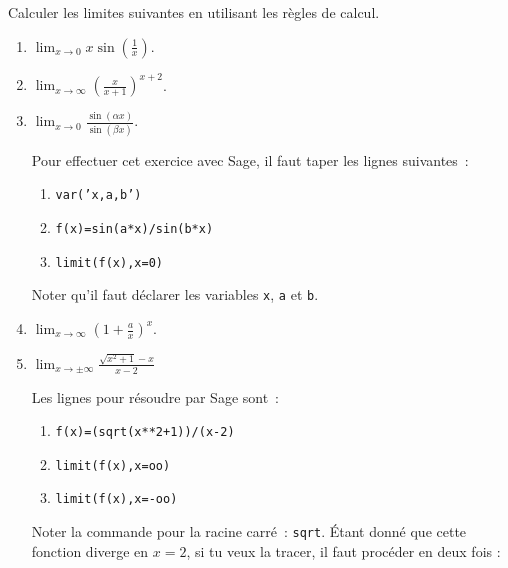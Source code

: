 

\begin{exercice}\label{exoINGE11140031}

	Calculer les limites suivantes en utilisant les règles de calcul.
	\begin{enumerate}

		\item	\label{ItemexoINGE_11140031xsinusx}
			$\lim_{x\to 0} x\sin(\frac{1}{ x })$.

		\item
			$\lim_{x\to \infty} \left( \frac{ x }{ x+1 } \right)^{x+2}$.

		\item	\label{ItemexoINGE_11140031}
			$\lim_{x\to 0} \frac{ \sin(\alpha x) }{ \sin(\beta x) }$.

			Pour effectuer cet exercice avec Sage, il faut taper les lignes suivantes~:
			\begin{enumerate}

				\item
					\texttt{var('x,a,b')}
				\item
					\texttt{f(x)=sin(a*x)/sin(b*x)}
				\item
					\texttt{limit(f(x),x=0)}

			\end{enumerate}
			Noter qu'il faut déclarer les variables \texttt{x}, \texttt{a} et \texttt{b}.

		\item
			$\lim_{x\to \infty} \left( 1+\frac{ a }{ x } \right)^x$.
			
		\item
			$\lim_{x\to \pm\infty} \frac{ \sqrt{x^2+1}-x }{ x-2 }$

			Les lignes pour résoudre par Sage sont~:
			\begin{enumerate}

				\item
					\texttt{f(x)=(sqrt(x**2+1))/(x-2)}
				\item
					\texttt{limit(f(x),x=oo)}
				\item
					\texttt{limit(f(x),x=-oo)}


			\end{enumerate}
			Noter la commande pour la racine carré~: \texttt{sqrt}. Étant donné que cette fonction diverge en $x=2$, si tu veux la tracer, il faut procéder en deux fois :
			\begin{enumerate}


\end{enumerate}
\end{enumerate}
\end{exercice}
